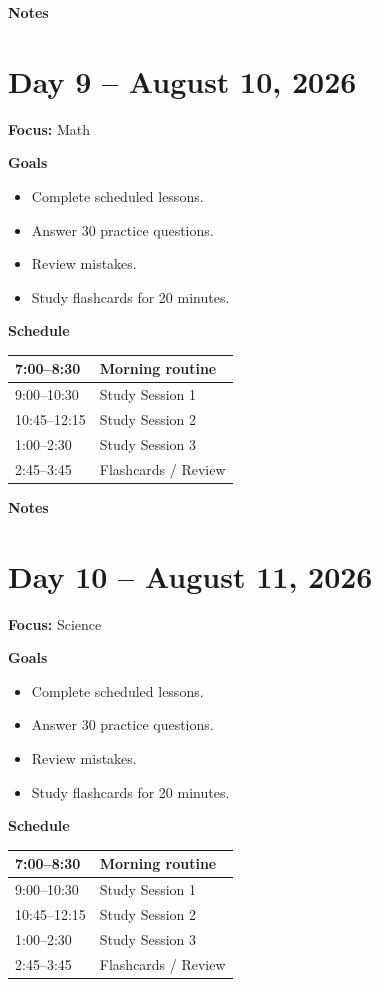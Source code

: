 \vspace{1em}
\textbf{Notes}

\vspace{8cm}

\newpage

\section*{Day 9 -- August 10, 2026}
\textbf{Focus:} Math

\textbf{Goals}
\begin{itemize}
\item Complete scheduled lessons.
\item Answer 30 practice questions.
\item Review mistakes.
\item Study flashcards for 20 minutes.
\end{itemize}

\textbf{Schedule}
\begin{tabular}{|p{4cm}|p{10cm}|}\hline
7:00--8:30 & Morning routine \\\hline
9:00--10:30 & Study Session 1 \\\hline
10:45--12:15 & Study Session 2 \\\hline
1:00--2:30 & Study Session 3 \\\hline
2:45--3:45 & Flashcards / Review \\\hline
\end{tabular}

\vspace{1em}
\textbf{Notes}

\vspace{8cm}

\newpage

\section*{Day 10 -- August 11, 2026}
\textbf{Focus:} Science

\textbf{Goals}
\begin{itemize}
\item Complete scheduled lessons.
\item Answer 30 practice questions.
\item Review mistakes.
\item Study flashcards for 20 minutes.
\end{itemize}

\textbf{Schedule}
\begin{tabular}{|p{4cm}|p{10cm}|}\hline
7:00--8:30 & Morning routine \\\hline
9:00--10:30 & Study Session 1 \\\hline
10:45--12:15 & Study Session 2 \\\hline
1:00--2:30 & Study Session 3 \\\hline
2:45--3:45 & Flashcards / Review \\\hline
\end{tabular}


